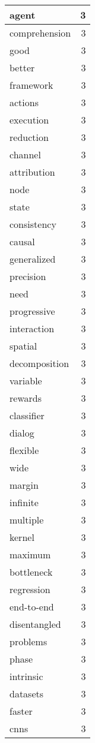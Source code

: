 \begin{table}[h]
\begin{tabular}{|l|r|}
\hline
agent & 3 \\
\hline
comprehension & 3 \\
\hline
good & 3 \\
\hline
better & 3 \\
\hline
framework & 3 \\
\hline
actions & 3 \\
\hline
execution & 3 \\
\hline
reduction & 3 \\
\hline
channel & 3 \\
\hline
attribution & 3 \\
\hline
node & 3 \\
\hline
state & 3 \\
\hline
consistency & 3 \\
\hline
causal & 3 \\
\hline
generalized & 3 \\
\hline
precision & 3 \\
\hline
need & 3 \\
\hline
progressive & 3 \\
\hline
interaction & 3 \\
\hline
spatial & 3 \\
\hline
decomposition & 3 \\
\hline
variable & 3 \\
\hline
rewards & 3 \\
\hline
classifier & 3 \\
\hline
dialog & 3 \\
\hline
flexible & 3 \\
\hline
wide & 3 \\
\hline
margin & 3 \\
\hline
infinite & 3 \\
\hline
multiple & 3 \\
\hline
kernel & 3 \\
\hline
maximum & 3 \\
\hline
bottleneck & 3 \\
\hline
regression & 3 \\
\hline
end-to-end & 3 \\
\hline
disentangled & 3 \\
\hline
problems & 3 \\
\hline
phase & 3 \\
\hline
intrinsic & 3 \\
\hline
datasets & 3 \\
\hline
faster & 3 \\
\hline
cnns & 3 \\

\end{tabular}
\end{table}
